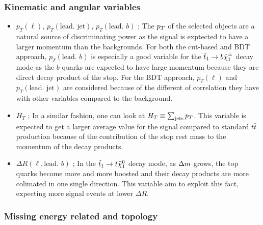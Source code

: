            \subsubsection{Kinematic and angular variables}

                \begin{itemize}
                    \item $p_T(\ell)$, $p_T(\text{lead. jet})$, $p_T(\text{lead. } b)$ ; The $p_T$ of the 
                        selected objects are a natural source of discriminating power as the signal is exptected 
                        to have a larger momentum than the backgrounds. For both the cut-based and BDT approach, 
                        $p_T(\text{lead. } b)$ is especially a good variable for the $\tilde{t}_1 \rightarrow b \tilde{\chi}_1^\pm$ 
                        decay mode as the $b$ quarks are expected to have large momentum because they are direct 
                        decay product of the stop. For the BDT approach, $p_T(\ell)$ and $p_T(\text{lead. jet})$ 
                        are considered because of the different of correlation they have with other variables 
                        compared to the background.
                    \item $H_T$ ; In a similar fashion, one can look at $H_T \equiv \sum_{\text{jets}} p_T$. 
                        This variable is expected to get a larger average value for the signal compared to standard 
                        $t\bar{t}$ production because of the contribution of the stop rest mass to the momentum of 
                        the decay products.
                    \item $\Delta R( \ell, \text{lead. } b)$ ; In the $\tilde{t}_1 \rightarrow t \tilde{\chi}_1^0$ decay mode,
                        as $\Delta m$ grows, the top quarks become more and more boosted and their decay products are 
                        more colimated in one single direction. This variable aim to exploit this fact, expecting more 
                        signal events at lower $\Delta R$.
                \end{itemize}

           \subsubsection{Missing energy related and topology}

